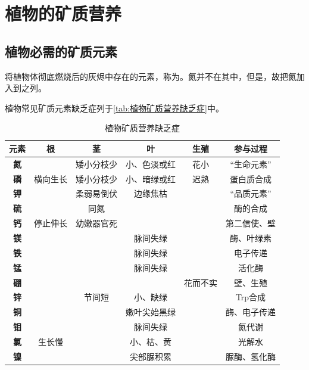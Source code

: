 \section{植物的矿质营养}

\subsection{植物必需的矿质元素}

将植物体彻底燃烧后的灰烬中存在的元素，称为。氮并不在其中，但是，故把氮加入到之列。

植物常见矿质元素缺乏症列于\autoref{tab:植物矿质营养缺乏症}中。

\begin{table}[htbp]
	\centering
	\begin{tabularx}{\textwidth}{|C|c|c|c|c|c|}
		\hline
		\textbf{元素} & 根 & 茎 & 叶 & 生殖 & 参与过程 \\ \hline
		\textbf{氮} &  & 矮小分枝少 & 小、色淡或红 & 花小 & “生命元素” \\ \hline
		\textbf{磷} & 横向生长\footnotemark & 矮小分枝少 & 小、暗绿或红 & 迟熟 & 蛋白质合成 \\ \hline
		\textbf{钾} &  & 柔弱易倒伏 & 边缘焦枯 &  & “品质元素” \\ \hline
		\textbf{硫} &  & 同氮 &  &  & 酶的合成 \\ \hline
		\textbf{钙} & 停止伸长 & 幼嫩器官死 &  &  & 第二信使、壁 \\ \hline
		\textbf{镁} &  &  & 脉间失绿 &  & 酶、叶绿素 \\ \hline
		\textbf{铁} &  &  & 脉间失绿 &  & 电子传递 \\ \hline
		\textbf{锰} &  &  & 脉间失绿 &  & 活化酶 \\ \hline
		\textbf{硼} &  &  &  & 花而不实 & 壁、生殖 \\ \hline
		\textbf{锌} &  & 节间短 & 小、缺绿 &  & Trp合成 \\ \hline
		\textbf{铜} &  &  & 嫩叶尖始黑绿 &  & 酶、电子传递 \\ \hline
		\textbf{钼} &  &  & 脉间失绿 &  & 氮代谢 \\ \hline
		\textbf{氯} & 生长慢 &  & 小、枯、黄 &  & 光解水 \\ \hline
		\textbf{镍} &  &  & 尖部脲积累 &  & 脲酶、氢化酶 \\ \hline
	\end{tabularx}
	\caption{植物矿质营养缺乏症}
	\label{tab:植物矿质营养缺乏症}
\end{table}

